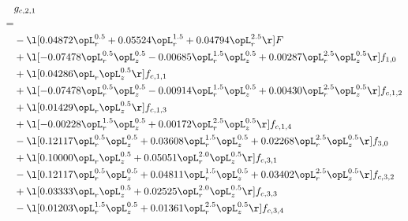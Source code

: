 \begin{alignat}{2} 
\label{eq:g_21_0} 
& g_{c,2,1} \nonumber \\ 
 = \\ 
& - \l[  0.04872 \opL_r^{0.5} +  0.05524 \opL_r^{1.5} +  0.04794 \opL_r^{2.5}  \r] F \nonumber \\ 
& + \l[  -0.07478 \opL_r^{0.5} \opL_z^{0.5}   -0.00685 \opL_r^{1.5} \opL_z^{0.5} +  0.00287 \opL_r^{2.5} \opL_z^{0.5}  \r] f_{1,0} \nonumber \\ 
& + \l[  0.04286 \opL_r \opL_z^{0.5}  \r] f_{c,1,1} \nonumber \\ 
& + \l[  -0.07478 \opL_r^{0.5} \opL_z^{0.5}   -0.00914 \opL_r^{1.5} \opL_z^{0.5} +  0.00430 \opL_r^{2.5} \opL_z^{0.5}  \r] f_{c,1,2} \nonumber \\ 
& + \l[  0.01429 \opL_r \opL_z^{0.5}  \r] f_{c,1,3} \nonumber \\ 
& + \l[  -0.00228 \opL_r^{1.5} \opL_z^{0.5} +  0.00172 \opL_r^{2.5} \opL_z^{0.5}  \r] f_{c,1,4} \nonumber \\ 
& - \l[  0.12117 \opL_r^{0.5} \opL_z^{0.5} +  0.03608 \opL_r^{1.5} \opL_z^{0.5} +  0.02268 \opL_r^{2.5} \opL_z^{0.5}  \r] f_{3,0} \nonumber \\ 
& + \l[  0.10000 \opL_r \opL_z^{0.5} +  0.05051 \opL_r^{2.0} \opL_z^{0.5}  \r] f_{c,3,1} \nonumber \\ 
& - \l[  0.12117 \opL_r^{0.5} \opL_z^{0.5} +  0.04811 \opL_r^{1.5} \opL_z^{0.5} +  0.03402 \opL_r^{2.5} \opL_z^{0.5}  \r] f_{c,3,2} \nonumber \\ 
& + \l[  0.03333 \opL_r \opL_z^{0.5} +  0.02525 \opL_r^{2.0} \opL_z^{0.5}  \r] f_{c,3,3} \nonumber \\ 
& - \l[  0.01203 \opL_r^{1.5} \opL_z^{0.5} +  0.01361 \opL_r^{2.5} \opL_z^{0.5}  \r] f_{c,3,4} \nonumber \\ 
\end{alignat} 


